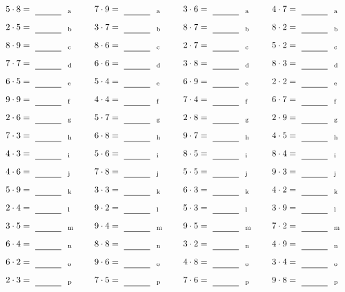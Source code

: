 \documentclass
[
  draft    = true,
  fontsize = 11pt,
  parskip  = half-
]
{scrartcl}
\begin{document}
\par\vfill\par
\begin{align*}
    \pline{5\cdot8}&=\rline{a}
  & \pline{7\cdot9}&=\rline{a}
  & \pline{3\cdot6}&=\rline{a}
  & \pline{4\cdot7}&=\rline{a} \\[1ex]
    \pline{2\cdot5}&=\rline{b}
  & \pline{3\cdot7}&=\rline{b}
  & \pline{8\cdot7}&=\rline{b}
  & \pline{8\cdot2}&=\rline{b} \\[1ex]
    \pline{8\cdot9}&=\rline{c}
  & \pline{8\cdot6}&=\rline{c}
  & \pline{2\cdot7}&=\rline{c}
  & \pline{5\cdot2}&=\rline{c} \\[1ex]
    \pline{7\cdot7}&=\rline{d}
  & \pline{6\cdot6}&=\rline{d}
  & \pline{3\cdot8}&=\rline{d}
  & \pline{8\cdot3}&=\rline{d} \\[1ex]
    \pline{6\cdot5}&=\rline{e}
  & \pline{5\cdot4}&=\rline{e}
  & \pline{6\cdot9}&=\rline{e}
  & \pline{2\cdot2}&=\rline{e} \\[1ex]
    \pline{9\cdot9}&=\rline{f}
  & \pline{4\cdot4}&=\rline{f}
  & \pline{7\cdot4}&=\rline{f}
  & \pline{6\cdot7}&=\rline{f} \\[1ex]
    \pline{2\cdot6}&=\rline{g}
  & \pline{5\cdot7}&=\rline{g}
  & \pline{2\cdot8}&=\rline{g}
  & \pline{2\cdot9}&=\rline{g} \\[1ex]
    \pline{7\cdot3}&=\rline{h}
  & \pline{6\cdot8}&=\rline{h}
  & \pline{9\cdot7}&=\rline{h}
  & \pline{4\cdot5}&=\rline{h} \\[1ex]
    \pline{4\cdot3}&=\rline{i}
  & \pline{5\cdot6}&=\rline{i}
  & \pline{8\cdot5}&=\rline{i}
  & \pline{8\cdot4}&=\rline{i} \\[1ex]
    \pline{4\cdot6}&=\rline{j}
  & \pline{7\cdot8}&=\rline{j}
  & \pline{5\cdot5}&=\rline{j}
  & \pline{9\cdot3}&=\rline{j} \\[1ex]
    \pline{5\cdot9}&=\rline{k}
  & \pline{3\cdot3}&=\rline{k}
  & \pline{6\cdot3}&=\rline{k}
  & \pline{4\cdot2}&=\rline{k} \\[1ex]
    \pline{2\cdot4}&=\rline{l}
  & \pline{9\cdot2}&=\rline{l}
  & \pline{5\cdot3}&=\rline{l}
  & \pline{3\cdot9}&=\rline{l} \\[1ex]
    \pline{3\cdot5}&=\rline{m}
  & \pline{9\cdot4}&=\rline{m}
  & \pline{9\cdot5}&=\rline{m}
  & \pline{7\cdot2}&=\rline{m} \\[1ex]
    \pline{6\cdot4}&=\rline{n}
  & \pline{8\cdot8}&=\rline{n}
  & \pline{3\cdot2}&=\rline{n}
  & \pline{4\cdot9}&=\rline{n} \\[1ex]
    \pline{6\cdot2}&=\rline{o}
  & \pline{9\cdot6}&=\rline{o}
  & \pline{4\cdot8}&=\rline{o}
  & \pline{3\cdot4}&=\rline{o} \\[1ex]
    \pline{2\cdot3}&=\rline{p}
  & \pline{7\cdot5}&=\rline{p}
  & \pline{7\cdot6}&=\rline{p}
  & \pline{9\cdot8}&=\rline{p}
\end{align*}
\end{document}
